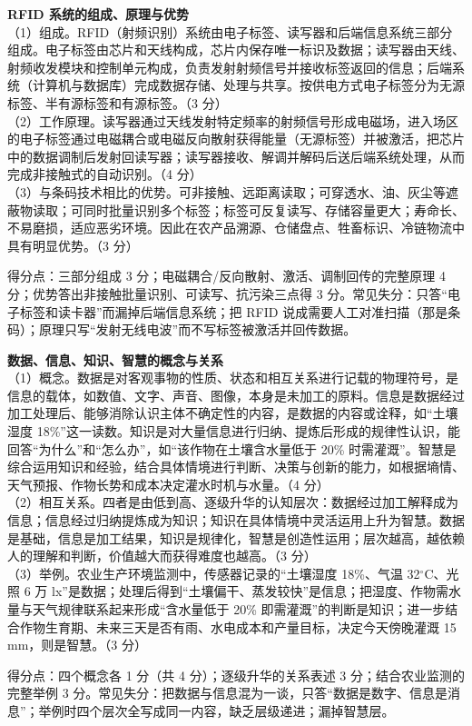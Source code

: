 \documentclass[a4paper,11pt]{article}
\begin{document}
\q \textbf{RFID 系统的组成、原理与优势}\\
（1）组成。RFID（射频识别）系统由电子标签、读写器和后端信息系统三部分组成。电子标签由芯片和天线构成，芯片内保存唯一标识及数据；读写器由天线、射频收发模块和控制单元构成，负责发射射频信号并接收标签返回的信息；后端系统（计算机与数据库）完成数据存储、处理与共享。按供电方式电子标签分为无源标签、半有源标签和有源标签。（3 分）\\
（2）工作原理。读写器通过天线发射特定频率的射频信号形成电磁场，进入场区的电子标签通过电磁耦合或电磁反向散射获得能量（无源标签）并被激活，把芯片中的数据调制后发射回读写器；读写器接收、解调并解码后送后端系统处理，从而完成非接触式的自动识别。（4 分）\\
（3）与条码技术相比的优势。可非接触、远距离读取；可穿透水、油、灰尘等遮蔽物读取；可同时批量识别多个标签；标签可反复读写、存储容量更大；寿命长、不易磨损，适应恶劣环境。因此在农产品溯源、仓储盘点、牲畜标识、冷链物流中具有明显优势。（3 分）
\begin{analysis}得分点：三部分组成 3 分；电磁耦合/反向散射、激活、调制回传的完整原理 4 分；优势答出非接触批量识别、可读写、抗污染三点得 3 分。常见失分：只答“电子标签和读卡器”而漏掉后端信息系统；把 RFID 说成需要人工对准扫描（那是条码）；原理只写“发射无线电波”而不写标签被激活并回传数据。\end{analysis}

\q \textbf{数据、信息、知识、智慧的概念与关系}\\
（1）概念。数据是对客观事物的性质、状态和相互关系进行记载的物理符号，是信息的载体，如数值、文字、声音、图像，本身是未加工的原料。信息是数据经过加工处理后、能够消除认识主体不确定性的内容，是数据的内容或诠释，如“土壤湿度 18\%”这一读数。知识是对大量信息进行归纳、提炼后形成的规律性认识，能回答“为什么”和“怎么办”，如“该作物在土壤含水量低于 20\% 时需灌溉”。智慧是综合运用知识和经验，结合具体情境进行判断、决策与创新的能力，如根据墒情、天气预报、作物长势和成本决定灌水时机与水量。（4 分）\\
（2）相互关系。四者是由低到高、逐级升华的认知层次：数据经过加工解释成为信息；信息经过归纳提炼成为知识；知识在具体情境中灵活运用上升为智慧。数据是基础，信息是加工结果，知识是规律化，智慧是创造性运用；层次越高，越依赖人的理解和判断，价值越大而获得难度也越高。（3 分）\\
（3）举例。农业生产环境监测中，传感器记录的“土壤湿度 18\%、气温 32$^\circ$C、光照 6 万 lx”是数据；处理后得到“土壤偏干、蒸发较快”是信息；把湿度、作物需水量与天气规律联系起来形成“含水量低于 20\% 即需灌溉”的判断是知识；进一步结合作物生育期、未来三天是否有雨、水电成本和产量目标，决定今天傍晚灌溉 15 mm，则是智慧。（3 分）
\begin{analysis}得分点：四个概念各 1 分（共 4 分）；逐级升华的关系表述 3 分；结合农业监测的完整举例 3 分。常见失分：把数据与信息混为一谈，只答“数据是数字、信息是消息”；举例时四个层次全写成同一内容，缺乏层级递进；漏掉智慧层。\end{analysis}
\end{document}
